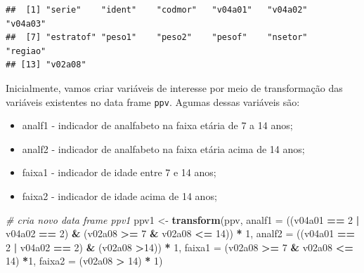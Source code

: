 \documentclass[]{book}
\newenvironment{Shaded}{\begin{snugshade}}{\end{snugshade}}
\newcommand{\KeywordTok}[1]{\textcolor[rgb]{0.13,0.29,0.53}{\textbf{#1}}}
\newcommand{\DataTypeTok}[1]{\textcolor[rgb]{0.13,0.29,0.53}{#1}}
\newcommand{\DecValTok}[1]{\textcolor[rgb]{0.00,0.00,0.81}{#1}}
\newcommand{\StringTok}[1]{\textcolor[rgb]{0.31,0.60,0.02}{#1}}
\newcommand{\CommentTok}[1]{\textcolor[rgb]{0.56,0.35,0.01}{\textit{#1}}}
\newcommand{\OperatorTok}[1]{\textcolor[rgb]{0.81,0.36,0.00}{\textbf{#1}}}
\newcommand{\NormalTok}[1]{#1}
\providecommand{\tightlist}{%
  \setlength{\itemsep}{0pt}\setlength{\parskip}{0pt}}
\theoremstyle{definition}
\theoremstyle{definition}
\theoremstyle{definition}
\theoremstyle{remark}
\begin{document}
\begin{verbatim}
##  [1] "serie"    "ident"    "codmor"   "v04a01"   "v04a02"   "v04a03"  
##  [7] "estratof" "peso1"    "peso2"    "pesof"    "nsetor"   "regiao"  
## [13] "v02a08"
\end{verbatim}

Inicialmente, vamos criar variáveis de interesse por meio de
transformação das variáveis existentes no data frame \texttt{ppv}.
Agumas dessas variáveis são:

\begin{itemize}
\tightlist
\item
  analf1 - indicador de analfabeto na faixa etária de 7 a 14 anos;
\item
  analf2 - indicador de analfabeto na faixa etária acima de 14 anos;
\item
  faixa1 - indicador de idade entre 7 e 14 anos;
\item
  faixa2 - indicador de idade acima de 14 anos;
\end{itemize}

\begin{Shaded}
\begin{Highlighting}[]
\CommentTok{# cria novo data frame ppv1}
\NormalTok{ppv1 <-}\StringTok{ }\KeywordTok{transform}\NormalTok{(ppv, }
\DataTypeTok{analf1 =}\NormalTok{ ((v04a01 }\OperatorTok{==}\StringTok{ }\DecValTok{2} \OperatorTok{|}\StringTok{ }\NormalTok{v04a02 }\OperatorTok{==}\StringTok{ }\DecValTok{2}\NormalTok{) }\OperatorTok{&}\StringTok{ }\NormalTok{(v02a08 }\OperatorTok{>=}\StringTok{ }\DecValTok{7} \OperatorTok{&}\StringTok{ }\NormalTok{v02a08 }\OperatorTok{<=}\StringTok{ }\DecValTok{14}\NormalTok{)) }\OperatorTok{*}\StringTok{ }\DecValTok{1}\NormalTok{, }
\DataTypeTok{analf2 =}\NormalTok{ ((v04a01 }\OperatorTok{==}\StringTok{ }\DecValTok{2} \OperatorTok{|}\StringTok{ }\NormalTok{v04a02 }\OperatorTok{==}\StringTok{ }\DecValTok{2}\NormalTok{) }\OperatorTok{&}\StringTok{ }\NormalTok{(v02a08 }\OperatorTok{>}\DecValTok{14}\NormalTok{)) }\OperatorTok{*}\StringTok{ }\DecValTok{1}\NormalTok{, }
\DataTypeTok{faixa1 =}\NormalTok{ (v02a08 }\OperatorTok{>=}\StringTok{ }\DecValTok{7} \OperatorTok{&}\StringTok{ }\NormalTok{v02a08 }\OperatorTok{<=}\StringTok{ }\DecValTok{14}\NormalTok{) }\OperatorTok{*}\DecValTok{1}\NormalTok{, }
\DataTypeTok{faixa2 =}\NormalTok{ (v02a08 }\OperatorTok{>}\StringTok{ }\DecValTok{14}\NormalTok{) }\OperatorTok{*}\StringTok{ }\DecValTok{1}\NormalTok{)}
\end{Highlighting}
\end{Shaded}
\end{document}
